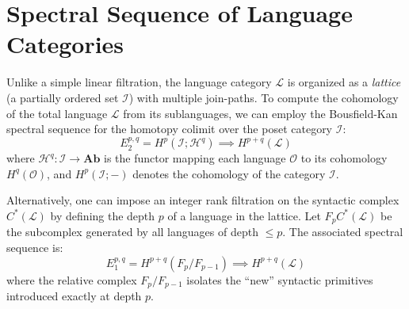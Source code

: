 \documentclass{article}
\theoremstyle{definition}
\theoremstyle{plain}
\begin{document}
\newpage
\section{Spectral Sequence of Language Categories}
Unlike a simple linear filtration, the language category $\mathcal{L}$ is
organized as a \emph{lattice} (a partially ordered set $\mathcal{I}$) with multiple join-paths. 
To compute the cohomology of the total language $\mathcal{L}$ from its sublanguages, we can employ the Bousfield-Kan spectral sequence for the homotopy colimit over the poset category $\mathcal{I}$:
\[ E_2^{p,q} = H^p(\mathcal{I}; \mathcal{H}^q) \implies H^{p+q}(\mathcal{L}) \]
where $\mathcal{H}^q : \mathcal{I} \to \mathbf{Ab}$ is the functor mapping each language $\mathcal{O}$ to its cohomology $H^q(\mathcal{O})$, and $H^p(\mathcal{I}; -)$ denotes the cohomology of the category $\mathcal{I}$.

Alternatively, one can impose an integer rank filtration on the syntactic complex $C^*(\mathcal{L})$ by defining the depth $p$ of a language in the lattice. Let $F_p C^*(\mathcal{L})$ be the subcomplex generated by all languages of depth $\le p$. The associated spectral sequence is:
\[ E_1^{p,q} = H^{p+q}(F_p / F_{p-1}) \implies H^{p+q}(\mathcal{L}) \]
where the relative complex $F_p / F_{p-1}$ isolates the ``new'' syntactic primitives introduced exactly at depth $p$.

\begin{table}[ht]
\centering
{}
\caption{The language lattice: filtration indices and constructor counts.
Note the split at $p=2$ (Christine/Per), the four sublanguages of Urs at $p=4$ (Homotopy, SupSmth, DiffK, Urs), and the separate branch indices
for Dan, Mike, and Ulrik.}
\end{table}
\end{document}
